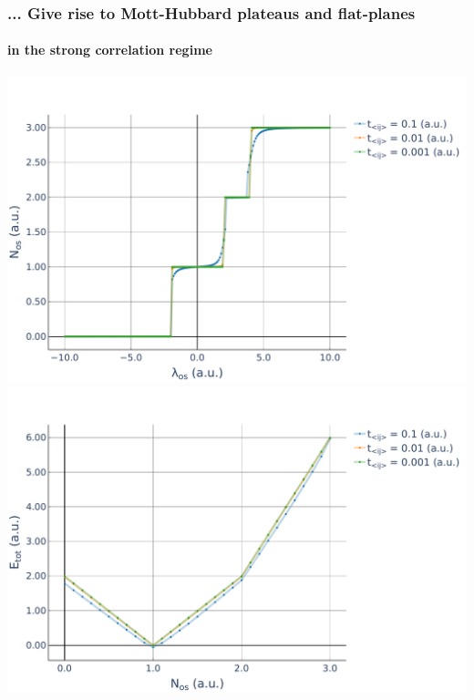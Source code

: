 \documentclass[aspectratio=169]{beamer}
\begin{document}
\begin{frame}
  \frametitle{... Give rise to Mott-Hubbard plateaus and flat-planes}
  \framesubtitle{in the strong correlation regime}
  \begin{center}
    \includegraphics[scale=0.22]{../img/BH-3in3-NvsMu.pdf}
    \includegraphics[scale=0.22]{../img/BH-3in3-EvsN.pdf}
  \end{center}
\end{frame}
\end{document}
